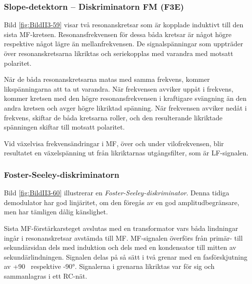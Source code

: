 \subsubsection{Slope-detektorn -- Diskriminatorn FM (F3E)}


Bild \ref{fig:BildII3-59} visar två resonanskretsar som är kopplade induktivt
till den sista MF-kretsen.
Resonansfrekvensen för dessa båda kretsar är något högre respektive något lägre
än mellanfrekvensen.
De signalspänningar som uppträder över resonanskretsarna likriktas och
seriekopplas med varandra med motsatt polaritet.

När de båda resonanskretsarna matas med samma frekvens, kommer
likspänningarna att ta ut varandra.
När frekvensen avviker uppåt i frekvens, kommer kretsen med den högre
resonansfrekvensen i kraftigare svängning än den andra kretsen och avger högre
likriktad spänning.
När frekvensen avviker nedåt i frekvens, skiftar de båda kretsarna roller,
och den resulterande likriktade spänningen skiftar till motsatt polaritet.

Vid växelvisa frekvensändringar i MF, över och under vilofrekvensen, blir
resultatet en växelspänning ut från likriktarnas utgångsfilter, som är
LF-signalen.

\subsubsection{Foster-Seeley-diskriminatorn}


Bild \ref{fig:BildII3-60} illustrerar en \emph{Foster-Seeley-diskriminator}.
Denna tidiga demodulator har god linjäritet, om den föregås av en god
amplitudbegränsare, men har tämligen dålig känslighet.

Sista MF-förstärkarsteget avslutas med en transformator vars båda
lindningar ingår i resonanskretsar avstämda till MF.
MF-signalen överförs från primär- till sekundärsidan dels med induktion och dels
med en kondensator till mitten av sekundärlindningen.
Signalen delas på så sätt i två grenar med en fasförskjutning av +90\degree~
respektive \ang{-90}.
Signalerna i grenarna likriktas var för sig och sammanlagras i ett RC-nät.

